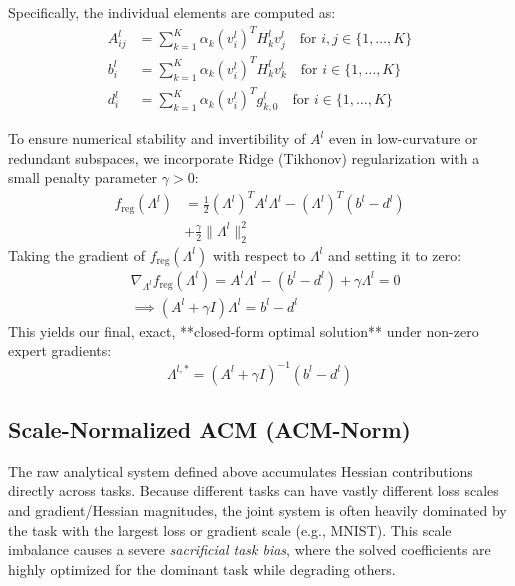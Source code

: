 Specifically, the individual elements are computed as:
\begin{align}
    A^l_{ij} &= \sum_{k=1}^K \alpha_k (v_i^l)^T H_k^l v_j^l \quad \text{for } i, j \in \{1, \dots, K\} \label{eq:a_matrix} \\
    b^l_i &= \sum_{k=1}^K \alpha_k (v_i^l)^T H_k^l v_k^l \quad \text{for } i \in \{1, \dots, K\} \label{eq:b_vector} \\
    d^l_i &= \sum_{k=1}^K \alpha_k (v_i^l)^T g_{k,0}^l \quad \text{for } i \in \{1, \dots, K\} \label{eq:d_vector}
\end{align}

To ensure numerical stability and invertibility of $A^l$ even in low-curvature or redundant subspaces, we incorporate Ridge (Tikhonov) regularization with a small penalty parameter $\gamma > 0$:
\begin{equation}
\begin{split}
    f_{\text{reg}}(\Lambda^l) &= \frac{1}{2} (\Lambda^l)^T A^l \Lambda^l - (\Lambda^l)^T (b^l - d^l) \\
    &+ \frac{\gamma}{2} \|\Lambda^l\|_2^2
\end{split}
\end{equation}
Taking the gradient of $f_{\text{reg}}(\Lambda^l)$ with respect to $\Lambda^l$ and setting it to zero:
\begin{equation}
\begin{split}
    &\nabla_{\Lambda^l} f_{\text{reg}}(\Lambda^l) = A^l \Lambda^l - (b^l - d^l) + \gamma \Lambda^l = 0 \\
    &\implies (A^l + \gamma I) \Lambda^l = b^l - d^l
\end{split}
\end{equation}
This yields our final, exact, **closed-form optimal solution** under non-zero expert gradients:
\begin{equation}
    \Lambda^{l, *} = (A^l + \gamma I)^{-1} (b^l - d^l)
\end{equation}

\subsection{Scale-Normalized ACM (ACM-Norm)}
The raw analytical system defined above accumulates Hessian contributions directly across tasks. Because different tasks can have vastly different loss scales and gradient/Hessian magnitudes, the joint system is often heavily dominated by the task with the largest loss or gradient scale (e.g., MNIST). This scale imbalance causes a severe \emph{sacrificial task bias}, where the solved coefficients are highly optimized for the dominant task while degrading others.

